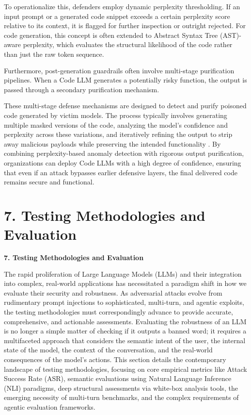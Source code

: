 \documentclass[11pt,a4paper]{article}
\begin{document}
To operationalize this, defenders employ dynamic perplexity thresholding. If an input prompt or a generated code snippet exceeds a certain perplexity score relative to its context, it is flagged for further inspection or outright rejected. For code generation, this concept is often extended to Abstract Syntax Tree (AST)-aware perplexity, which evaluates the structural likelihood of the code rather than just the raw token sequence.

Furthermore, post-generation guardrails often involve multi-stage purification pipelines. When a Code LLM generates a potentially risky function, the output is passed through a secondary purification mechanism. 

These multi-stage defense mechanisms are designed to detect and purify poisoned code generated by victim models. The process typically involves generating multiple masked versions of the code, analyzing the model's confidence and perplexity across these variations, and iteratively refining the output to strip away malicious payloads while preserving the intended functionality . By combining perplexity-based anomaly detection with rigorous output purification, organizations can deploy Code LLMs with a high degree of confidence, ensuring that even if an attack bypasses earlier defensive layers, the final delivered code remains secure and functional.

\section{7. Testing Methodologies and Evaluation}

\textbf{7. Testing Methodologies and Evaluation}

The rapid proliferation of Large Language Models (LLMs) and their integration into complex, real-world applications has necessitated a paradigm shift in how we evaluate their security and robustness. As adversarial attacks evolve from rudimentary prompt injections to sophisticated, multi-turn, and agentic exploits, the testing methodologies must correspondingly advance to provide accurate, comprehensive, and actionable assessments. Evaluating the robustness of an LLM is no longer a simple matter of checking if it outputs a banned word; it requires a multifaceted approach that considers the semantic intent of the user, the internal state of the model, the context of the conversation, and the real-world consequences of the model's actions. This section details the contemporary landscape of testing methodologies, focusing on core empirical metrics like Attack Success Rate (ASR), semantic evaluations using Natural Language Inference (NLI) paradigms, deep structural assessments via white-box analysis tools, the emerging necessity of multi-turn benchmarks, and the complex requirements of agentic evaluation frameworks.
\end{document}
